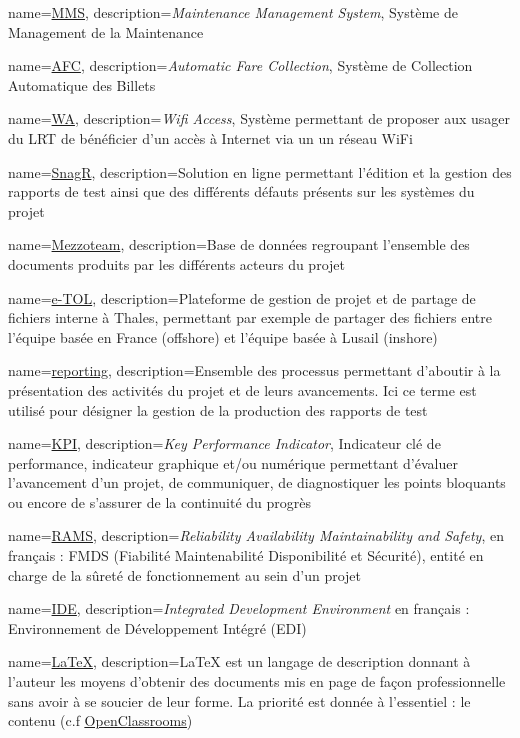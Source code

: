 {
	name=\underline{MMS},
	description={\textit{Maintenance Management System}, Système de Management de la Maintenance}
}

{
	name=\underline{AFC},
	description={\textit{Automatic Fare Collection}, Système de Collection Automatique des Billets}
}

{
	name=\underline{WA},
	description={\textit{Wifi Access}, Système permettant de proposer aux usager du LRT de bénéficier d'un accès à Internet via un un réseau WiFi}
}

{
	name=\underline{SnagR},
	description={Solution en ligne permettant l'édition et la gestion des rapports de test ainsi que des différents défauts présents sur les systèmes du projet }
}


{
	name=\underline{Mezzoteam},
	description={Base de données regroupant l'ensemble des documents produits par les différents acteurs du projet}
}

{
	name=\underline{e-TOL},
	description={Plateforme de gestion de projet et de partage de fichiers interne à Thales, permettant par exemple de partager des fichiers entre l'équipe basée en France (offshore) et l'équipe basée à Lusail (inshore)}
}

{
	name=\underline{reporting},
	description={Ensemble des processus permettant d'aboutir à la présentation des activités du projet et de leurs avancements. Ici ce terme est utilisé pour désigner la gestion de la production des rapports de test}
}

{
	name=\underline{KPI},
	description={\textit{Key Performance Indicator}, Indicateur clé de performance, indicateur graphique et/ou numérique permettant d'évaluer l'avancement d'un projet, de communiquer, de diagnostiquer les points bloquants ou encore de s'assurer de la continuité du progrès}
}

{
	name=\underline{RAMS},
	description={\textit{Reliability Availability Maintainability and Safety}, en français : FMDS (Fiabilité Maintenabilité Disponibilité et Sécurité), entité en charge de la sûreté de fonctionnement au sein d'un projet}
}

{
	name=\underline{IDE},
	description={\textit{Integrated Development Environment} en français :  Environnement de Développement Intégré (EDI) }
}

{
	name=\underline{LaTeX},
	description={LaTeX est un langage de description donnant à l'auteur les moyens d'obtenir des documents mis en page de façon professionnelle sans avoir à se soucier de leur forme. La priorité est donnée à l'essentiel : le contenu (c.f \underline{\href{https://openclassrooms.com/fr/courses/1617396-redigez-des-documents-de-qualite-avec-latex/1617565-quest-ce-que-latex}{OpenClassrooms}})}
}

